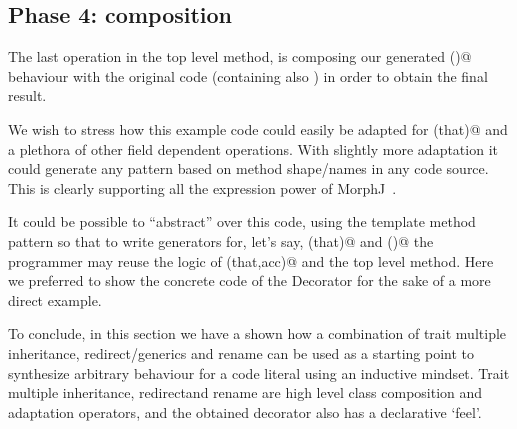\subsection*{Phase 4: composition}
The last operation in the top level method, is composing our generated \Q@toS()@ behaviour with the
original code (containing also \Q@sayHi@) in order to obtain the final result.

We wish to stress how this example code could easily be adapted for \Q@equals(that)@ and
a plethora of other field dependent operations.
With slightly more adaptation it could generate any pattern based on method shape/names in
any code source.
This is clearly supporting all the expression power of MorphJ~\cite{huang2008expressive}.

It could be possible to ``abstract'' over this code, using the template method pattern so that
to write generators for, let's say, \Q@equals(that)@ and \Q@toS()@ the programmer may reuse the logic of \Q@fold(that,acc)@ and the top level method.
Here we preferred to show the concrete code of the Decorator \Q@Stringable@ for the sake of a more
direct example.

To conclude, in this section we have a shown how a combination of
trait multiple inheritance, redirect/generics and rename
can be used as a starting point to synthesize arbitrary behaviour for a
code literal using an inductive mindset.
Trait multiple inheritance, redirectand rename
are high level class composition and adaptation operators,
and the obtained decorator also has a declarative `feel'.




